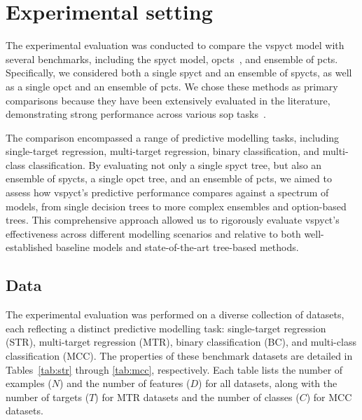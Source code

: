 \documentclass[3p,review,authoryear]{elsarticle}
\begin{document}
\section{Experimental setting}
The experimental evaluation was conducted to compare the \gls{vspyct} model with several benchmarks, including the \gls{spyct} model, \glspl{opct}~\citep{Stepisnik_2020}, and ensemble of \glspl{pct}.
Specifically, we considered both a single \gls{spyct} and an ensemble of \glspl{spyct}, as well as a single \gls{opct} and an ensemble of \glspl{pct}.
We chose these methods as primary comparisons because they have been extensively evaluated in the literature, demonstrating strong performance across various \gls{sop} tasks~\citep{Andonovikj_2024, Stepi_nik_2021}.

The comparison encompassed a range of predictive modelling tasks, including single-target regression, multi-target regression, binary classification, and multi-class classification.
By evaluating not only a single \gls{spyct} tree, but also an ensemble of \glspl{spyct}, a single \gls{opct} tree, and an ensemble of \glspl{pct}, we aimed to assess how \gls{vspyct}'s predictive performance compares against a spectrum of models, from single decision trees to more complex ensembles and option-based trees.
This comprehensive approach allowed us to rigorously evaluate \gls{vspyct}'s effectiveness across different modelling scenarios and relative to both well-established baseline models and state-of-the-art tree-based methods.


\subsection{Data}

The experimental evaluation was performed on a diverse collection of datasets, each reflecting a distinct predictive modelling task: single-target regression (STR), multi-target regression (MTR), binary classification (BC), and multi-class classification (MCC).
The properties of these benchmark datasets are detailed in Tables~\ref{tab:str} through \ref{tab:mcc}, respectively.
Each table lists the number of examples (\(N\)) and the number of features (\(D\)) for all datasets, along with the number of targets (\(T\)) for MTR datasets and the number of classes (\(C\)) for MCC datasets.
\end{document}
